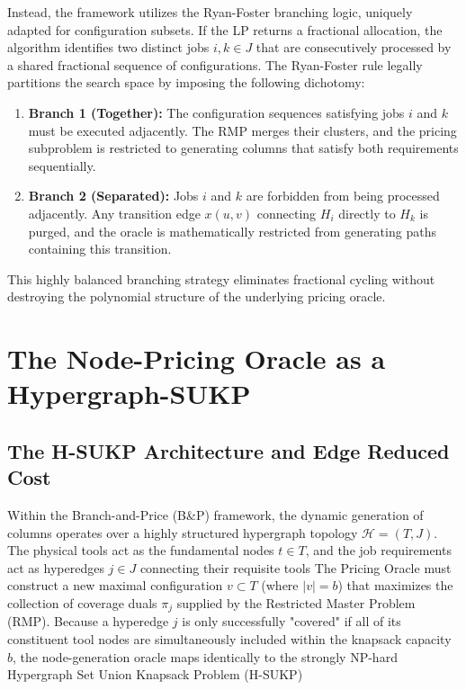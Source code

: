 \documentclass[11pt, a4paper]{book}
\begin{document}
	Instead, the framework utilizes the Ryan-Foster branching logic, uniquely adapted for configuration subsets. If the LP returns a fractional allocation, the algorithm identifies two distinct jobs $i, k \in J$ that are consecutively processed by a shared fractional sequence of configurations. The Ryan-Foster rule legally partitions the search space by imposing the following dichotomy:
	\begin{enumerate}
		\item \textbf{Branch 1 (Together):} The configuration sequences satisfying jobs $i$ and $k$ must be executed adjacently. The RMP merges their clusters, and the pricing subproblem is restricted to generating columns that satisfy both requirements sequentially.
		\item \textbf{Branch 2 (Separated):} Jobs $i$ and $k$ are forbidden from being processed adjacently. Any transition edge $x(u,v)$ connecting $H_i$ directly to $H_k$ is purged, and the oracle is mathematically restricted from generating paths containing this transition.
	\end{enumerate}
	This highly balanced branching strategy eliminates fractional cycling without destroying the polynomial structure of the underlying pricing oracle.
	
	\section{The Node-Pricing Oracle as a Hypergraph-SUKP}
	
	\subsection{The H-SUKP Architecture and Edge Reduced Cost}
	
	Within the Branch-and-Price (B\&P) framework, the dynamic generation of columns operates over a highly structured hypergraph topology $\mathcal{H} = (T, J)$. The physical tools act as the fundamental nodes $t \in T$, and the job requirements act as hyperedges $j \in J$ connecting their requisite tools %
	The Pricing Oracle must construct a new maximal configuration $v \subset T$ (where $|v| = b$) that maximizes the collection of coverage duals $\pi_j$ supplied by the Restricted Master Problem (RMP). Because a hyperedge $j$ is only successfully "covered" if all of its constituent tool nodes are simultaneously included within the knapsack capacity $b$, the node-generation oracle maps identically to the strongly NP-hard Hypergraph Set Union Knapsack Problem (H-SUKP) %
	
\end{document}
